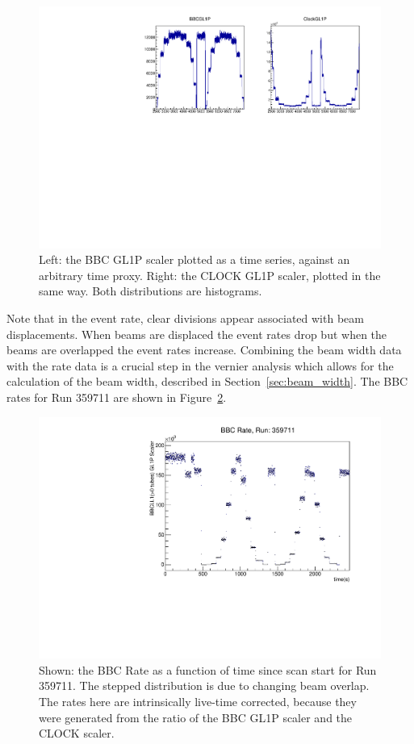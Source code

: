 \begin{figure}
  \centering
  \includegraphics[width=0.8\linewidth]{./figures/bbc_gl1_scalers.pdf}
  \caption{
    Left: the BBC GL1P scaler plotted as a time series, against an arbitrary
    time proxy. Right: the CLOCK GL1P scaler, plotted in the same way. Both
    distributions are histograms. 
  }
  \label{fig:bbc_gl1p_scaler}
\end{figure}

Note that in the event rate, clear divisions appear associated with beam
displacements. When beams are displaced the event rates drop but when the beams
are overlapped the event rates increase. Combining the beam width data with the
rate data is a crucial step in the vernier analysis which allows for the
calculation of the beam width, described in Section~\ref{sec:beam_width}.  The
BBC rates for Run 359711 are shown in Figure~\ref{fig:bbc_rate_359711}.

\begin{figure}
  \centering
  \includegraphics[width=0.8\linewidth]{./figures/bbc_rate_359711.pdf}
  \caption{
    Shown: the BBC Rate as a function of time since scan start for Run 359711.
    The stepped distribution is due to changing beam overlap. The rates here are
    intrinsically live-time corrected, because they were generated from the
    ratio of the BBC GL1P scaler and the CLOCK scaler.
  }
  \label{fig:bbc_rate_359711}
\end{figure}

